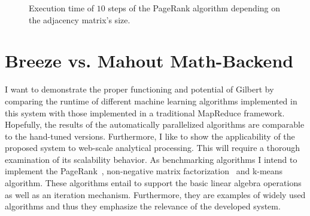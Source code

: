 \begin{figure}
	\centering
	\caption{Execution time of $10$ steps of the PageRank algorithm depending on the adjacency matrix's size.}
	\label{fig:pageRankResults}
\end{figure}

\section{Breeze vs. Mahout Math-Backend}

I want to demonstrate the proper functioning and potential of Gilbert by comparing the runtime of different machine learning algorithms implemented in this system with those implemented in a traditional MapReduce framework.
Hopefully, the results of the automatically parallelized algorithms are comparable to the hand-tuned versions.
Furthermore, I like to show the applicability of the proposed system to web-scale analytical processing.
This will require a thorough examination of its scalability behavior.
As benchmarking algorithms I intend to implement the PageRank~\cite{page:1999a}, non-negative matrix factorization~\cite{seung:anips2001a} and k-means~\cite{macqueen:1967a} algorithm.
These algorithms entail to support the basic linear algebra operations as well as an iteration mechanism.
Furthermore, they are examples of widely used algorithms and thus they emphasize the relevance of the developed system.